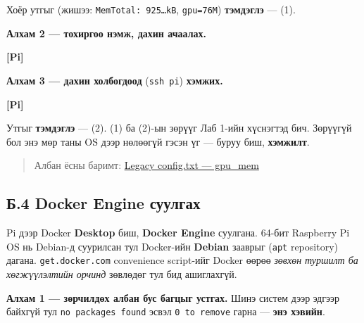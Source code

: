 Хоёр утгыг (жишээ: \texttt{MemTotal:\allowbreak{}\ 925\ldots{}kB}, \texttt{gpu=76M}) \textbf{тэмдэглэ} --- (1).

\textbf{Алхам 2 --- тохиргоо нэмж, дахин ачаалах.}

\textbf{{[}Pi{]}}

\begin{Shaded}
\begin{Highlighting}[]
  \KeywordTok{|} 
\end{Highlighting}
\end{Shaded}

\textbf{Алхам 3 --- дахин холбогдоод} (\texttt{ssh\ pi}) \textbf{хэмжих.}

\textbf{{[}Pi{]}}

\begin{Shaded}
\begin{Highlighting}[]
\end{Highlighting}
\end{Shaded}

Утгыг \textbf{тэмдэглэ} --- (2). (1) ба (2)-ын зөрүүг Лаб 1-ийн хүснэгтэд бич. Зөрүүгүй бол энэ мөр таны OS дээр нөлөөгүй гэсэн үг --- буруу биш, \textbf{хэмжилт}.

\begin{quote}
Албан ёсны баримт: \href{https://www.raspberrypi.com/documentation/computers/legacy_config_txt.html\#gpu_mem}{Legacy config.\allowbreak{}txt --- gpu\_\allowbreak{}mem}
\end{quote}

\hypertarget{ux431.4-docker-engine-ux441ux443ux443ux43bux433ux430ux445}{%
\subsection{Б.4 Docker Engine суулгах}\label{ux431.4-docker-engine-ux441ux443ux443ux43bux433ux430ux445}}

Pi дээр Docker \textbf{Desktop} биш, \textbf{Docker Engine} суулгана. 64-бит Raspberry Pi OS нь Debian-д суурилсан тул Docker-ийн \textbf{Debian} зааврыг (\texttt{apt} repository) дагана. \texttt{get.docker.com} convenience script-ийг Docker өөрөө \emph{зөвхөн туршилт ба хөгжүүлэлтийн орчинд} зөвлөдөг тул бид ашиглахгүй.

\textbf{Алхам 1 --- зөрчилдөх албан бус багцыг устгах.} Шинэ систем дээр эдгээр байхгүй тул \texttt{no\ packages\ found} эсвэл \texttt{0\ to\ remove} гарна --- \textbf{энэ хэвийн}.

